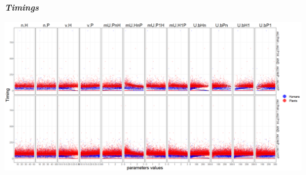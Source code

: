 \documentclass[]{book}
\begin{document}
\textbf{\emph{Timings}}

\includegraphics[width=1\linewidth]{plots/5_multiplePar-timing-bothLessBase-ggplot}
\end{document}
